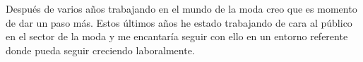 

\begin{cvparagraph}

Después de varios años trabajando en el mundo de la moda creo que es momento de dar un paso más. Estos últimos años he estado trabajando de cara al público en el sector de la moda y me encantaría seguir con ello en un entorno referente donde pueda seguir creciendo laboralmente.
\end{cvparagraph}
